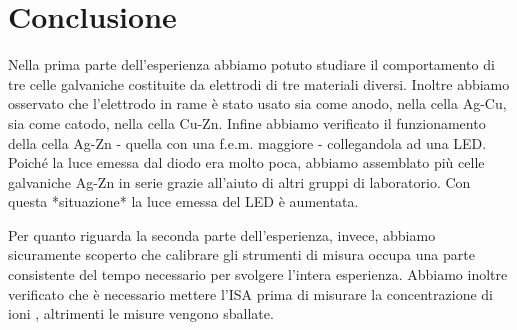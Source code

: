 \section*{Conclusione}

Nella prima parte dell'esperienza abbiamo potuto studiare il comportamento di tre celle galvaniche costituite da elettrodi di tre materiali diversi.
Inoltre abbiamo osservato che l'elettrodo in rame è stato usato sia come anodo, nella cella Ag-Cu, sia come catodo, nella cella Cu-Zn.
Infine abbiamo verificato il funzionamento della cella Ag-Zn - quella con una f.e.m. maggiore - collegandola ad una LED.
Poiché la luce emessa dal diodo era molto poca, abbiamo assemblato più celle galvaniche Ag-Zn in serie grazie all'aiuto di altri gruppi di laboratorio.
Con questa *situazione* la luce emessa del LED è aumentata.

Per quanto riguarda la seconda parte dell'esperienza, invece, abbiamo sicuramente scoperto che calibrare gli strumenti di misura occupa una parte consistente del tempo necessario per svolgere l'intera esperienza.
Abbiamo inoltre verificato che è necessario mettere l'ISA prima di misurare la concentrazione di ioni , altrimenti le misure vengono sballate.

